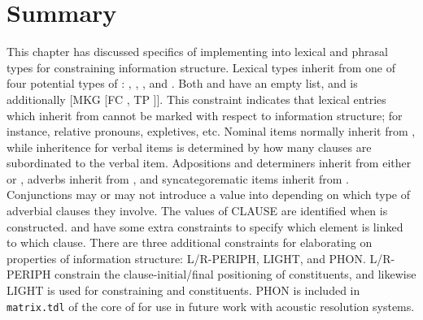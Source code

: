 \section{Summary}
\label{10-1:sec:summary}

This chapter has discussed specifics of implementing  into
lexical and phrasal types for constraining information
structure. Lexical types inherit from one of four potential types of
: ,
, , and
.  Both  and
 have an empty  list, and
 is additionally [MKG [FC , TP
    ]]. This constraint indicates that lexical entries
which inherit from  cannot be marked with
respect to information structure; for instance, relative pronouns,
expletives, etc.  Nominal items normally inherit from
, while inheritence for verbal items is
determined by how many clauses are subordinated to the verbal
item. Adpositions and determiners inherit from either
 or , adverbs
inherit from , and syncategorematic items
inherit from . Conjunctions may or may not
introduce a  value into  depending on which type
of adverbial clauses they involve. The values of CLAUSE are identified
when  is constructed.
 and  have
some extra constraints to specify which element is linked to which
clause. There are three additional
constraints for elaborating on properties of information structure:
L/R-PERIPH, LIGHT, and PHON.  L/R-PERIPH constrain the
clause-initial/final positioning of constituents, and likewise LIGHT
is used for constraining  and 
constituents. PHON is included in \texttt{matrix.tdl} of the core of
\lingo {} for use in future work with acoustic
resolution systems.

